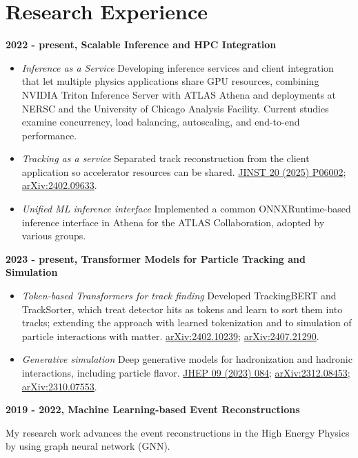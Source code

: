 \section*{Research Experience}

\noindent\textbf{2022 - present, Scalable Inference and HPC Integration}
\begin{itemize}
    \item \textit{Inference as a Service} Developing inference services and client integration that let multiple physics applications share GPU resources, combining NVIDIA Triton Inference Server with ATLAS Athena and deployments at NERSC and the University of Chicago Analysis Facility. Current studies examine concurrency, load balancing, autoscaling, and end-to-end performance.
    \item \textit{Tracking as a service} Separated track reconstruction from the client application so accelerator resources can be shared. \href{https://doi.org/10.1088/1748-0221/20/06/P06002}{JINST 20 (2025) P06002}; \href{https://arxiv.org/abs/2402.09633}{arXiv:2402.09633}.
    \item \textit{Unified ML inference interface} Implemented a common ONNXRuntime-based inference interface in Athena for the ATLAS Collaboration, adopted by various groups.
\end{itemize}

\noindent\textbf{2023 - present, Transformer Models for Particle Tracking and Simulation}
\begin{itemize}
    \item \textit{Token-based Transformers for track finding} Developed TrackingBERT and TrackSorter, which treat detector hits as tokens and learn to sort them into tracks; extending the approach with learned tokenization and to simulation of particle interactions with matter. \href{https://arxiv.org/abs/2402.10239}{arXiv:2402.10239}; \href{https://arxiv.org/abs/2407.21290}{arXiv:2407.21290}.
    \item \textit{Generative simulation} Deep generative models for hadronization and hadronic interactions, including particle flavor. \href{https://doi.org/10.1007/JHEP09(2023)084}{JHEP 09 (2023) 084}; \href{https://arxiv.org/abs/2312.08453}{arXiv:2312.08453}; \href{https://arxiv.org/abs/2310.07553}{arXiv:2310.07553}.
\end{itemize}

\noindent\textbf{2019 - 2022, Machine Learning-based Event Reconstructions}

\medskip
My research work advances the event reconstructions in the High Energy Physics by using graph neural network (GNN).

